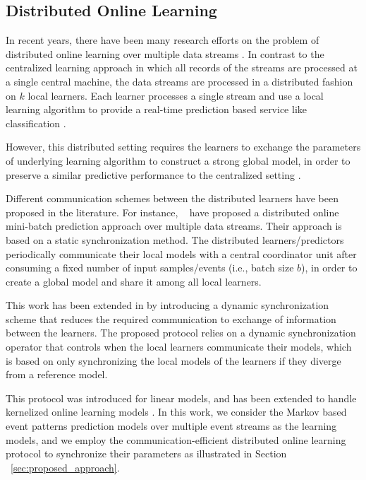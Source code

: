 
\subsection{Distributed Online Learning}

\par In recent years, there have been many research efforts on the problem of distributed online learning over multiple data streams \cite{tekin2014distributed,yan2013distributed,canzian2015ensemble,zhang2014fast,dekel2012optimal,kamp2014communication}.   In contrast to the centralized learning approach in which all records of the streams are processed at a single central machine, the data streams are processed in a distributed fashion on $k$ local learners. Each learner processes a single stream and use a local learning algorithm to provide a real-time prediction based service like classification \cite{canzian2015ensemble}.  

\par However, this distributed setting requires the learners to exchange the parameters of underlying learning algorithm to construct a strong global model, in order to preserve a similar predictive performance to the centralized setting \cite{kamp2014communication}. 

\par Different communication schemes between the distributed learners have been proposed in the literature. For instance, ~\citet{dekel2012optimal} have proposed a distributed online mini-batch prediction approach over multiple data streams. Their approach is based on a static synchronization method. The distributed learners/predictors periodically communicate  their local models with a central coordinator unit after consuming a fixed number of input samples/events (i.e., batch size $b$), in order to  create a global model  and share it among all local learners. 

\par This work has been extended in \cite{kamp2014communication} by introducing a dynamic synchronization scheme that reduces the required communication to  exchange of information between the learners. The proposed protocol relies on a dynamic synchronization operator that controls when the local learners communicate their models, which is based on only synchronizing the local models of the learners if they diverge from a reference model. 
 
\par This protocol was introduced for linear models, and has been extended to handle kernelized online learning models \cite{kamp2016communication}. In this work, we consider the Markov based event patterns prediction models \cite{alevizos2017event} over multiple event streams as the learning models, and we employ the communication-efficient distributed online learning protocol \cite{kamp2014communication} to synchronize their parameters as illustrated in Section ~\ref{sec:proposed_approach}. 
